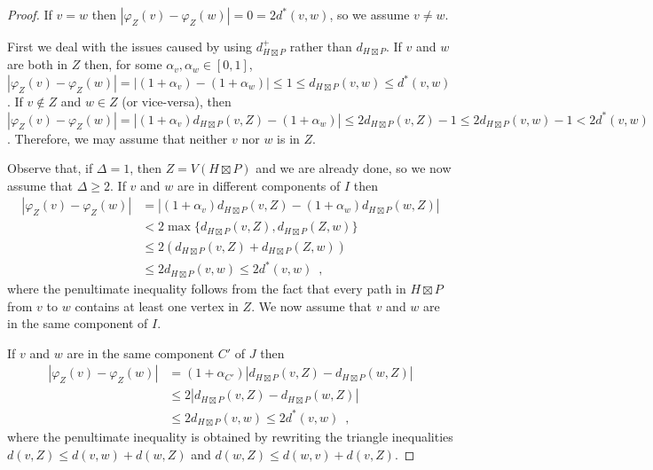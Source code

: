 \documentclass{patmorin}
\renewcommand{\ge}{\geqslant}
\renewcommand{\le}{\leqslant}
\begin{document}
\begin{proof}
  If $v=w$ then $|\varphi_Z(v)-\varphi_Z(w)|=0 = 2 d^*(v,w)$, so we assume $v\neq w$.

  First we deal with the issues caused by using $d^+_{H\boxtimes P}$ rather than $d_{H\boxtimes P}$.  If $v$ and $w$ are both in $Z$ then, for some $\alpha_v,\alpha_w\in [0,1]$,  $|\varphi_Z(v)-\varphi_Z(w)|=|(1+\alpha_v)-(1+\alpha_w)|\le 1 \le d_{H\boxtimes P}(v,w)\le d^*(v,w)$.  If $v\not\in Z$ and $w\in Z$ (or vice-versa), then $|\varphi_Z(v)-\varphi_Z(w)|= |(1+\alpha_v)d_{H\boxtimes P}(v,Z)-(1+\alpha_w)|\le 2d_{H\boxtimes P}(v,Z)-1\le 2d_{H\boxtimes P}(v,w)-1< 2d^*(v,w)$.  Therefore, we may assume that neither $v$ nor $w$ is in $Z$.

  Observe that, if $\Delta=1$, then $Z=V(H\boxtimes P)$ and we are already done, so we now assume that $\Delta\ge 2$.  If $v$ and $w$ are in different components of $I$ then
  \begin{align*}
     |\varphi_Z(v)-\varphi_Z(w)|
    & =|(1+\alpha_v)d_{H\boxtimes P}(v,Z)-(1+\alpha_w)d_{H\boxtimes P}(w,Z)| \\
    & < 2\max\{d_{H\boxtimes P}(v,Z), d_{H\boxtimes P}(Z,w)\} \\
    & \le 2\left(d_{H\boxtimes P}(v,Z) + d_{H\boxtimes P}(Z,w)\right) \\
    & \le 2d_{H\boxtimes P}(v,w) \le 2d^*(v,w) \enspace ,
  \end{align*}
  where the penultimate inequality follows from the fact that every path in $H\boxtimes P$ from $v$ to $w$ contains at least one vertex in $Z$.  We now assume that $v$ and $w$ are in the same component of $I$.

  If $v$ and $w$ are in the same component $C'$ of $J$ then
  \begin{align*}
    |\varphi_Z(v)-\varphi_Z(w)|
    & =(1+\alpha_{C'})|d_{H\boxtimes P}(v,Z)-d_{H\boxtimes P}(w,Z)| \\
    & \le 2|d_{H\boxtimes P}(v,Z)-d_{H\boxtimes P}(w,Z)| \\
    & \le 2 d_{H\boxtimes P}(v,w) \le 2d^*(v,w) \enspace ,
  \end{align*}
  where the penultimate inequality is obtained by rewriting the triangle inequalities $d(v,Z)\le d(v,w)+d(w,Z)$ and $d(w,Z)\le d(w,v)+d(v,Z)$.


\end{proof}
\end{document}
